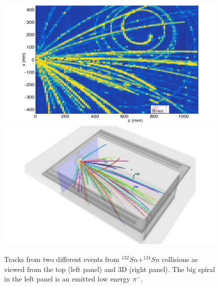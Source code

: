 \documentclass[%
10pt]{article}
\begin{document}
\begin{figure}[htb!]
\centering
\includegraphics[width=0.45\linewidth]{figures/tracks_top_view.pdf}
\includegraphics[width=0.45\linewidth]{figures/tracks_3d_view.pdf}
\caption{
Tracks from two different events from $^{132}Sn+^{124}Sn$ collisions as viewed from the top (left panel) and 3D (right panel). The big spiral in the left panel is an emitted low energy $\pi^-$.
}
\end{figure}
\clearpage
\newpage
\end{document}
